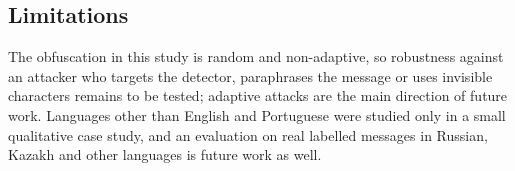 \subsection{Limitations}\label{sec:limitations}

The obfuscation in this study is random and non-adaptive, so robustness against an attacker who targets the detector, paraphrases the message or uses invisible characters remains to be tested; adaptive attacks are the main direction of future work. Languages other than English and Portuguese were studied only in a small qualitative case study, and an evaluation on real labelled messages in Russian, Kazakh and other languages is future work as well.
